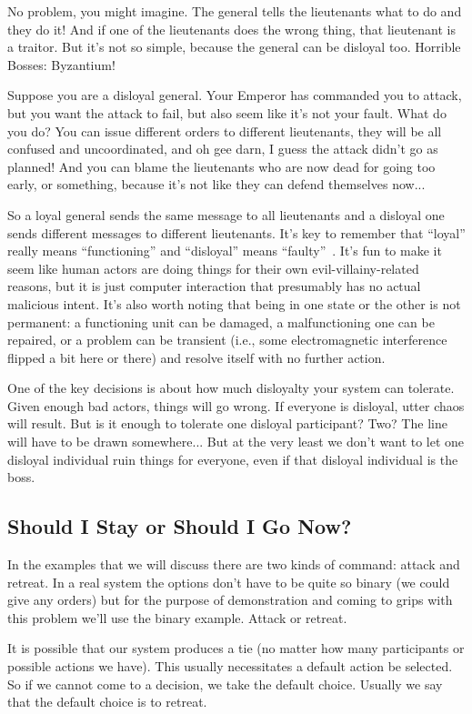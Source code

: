 No problem, you might imagine. The general tells the lieutenants what to do and they do it! And if one of the lieutenants does the wrong thing, that lieutenant is a traitor. But it's not so simple, because the general can be disloyal too. Horrible Bosses: Byzantium!

Suppose you are a disloyal general. Your Emperor has commanded you to attack, but you want the attack to fail, but also seem like it's not your fault. What do you do? You can issue different orders to different lieutenants, they will be all confused and uncoordinated, and oh gee darn, I guess the attack didn't go as planned! And you can blame the lieutenants who are now dead for going too early, or something, because it's not like they can defend themselves now...

So a loyal general sends the same message to all lieutenants and a disloyal one sends different messages to different lieutenants. It's key to remember that ``loyal'' really means ``functioning'' and ``disloyal'' means ``faulty''~\cite{mte241}. It's fun to make it seem like human actors are doing things for their own evil-villainy-related reasons, but it is just computer interaction that presumably has no actual malicious intent. It's also worth noting that being in one state or the other is not permanent: a functioning unit can be damaged, a malfunctioning one can be repaired, or a problem can be transient (i.e., some electromagnetic interference flipped a bit here or there) and resolve itself with no further action.

One of the key decisions is about how much disloyalty your system can tolerate. Given enough bad actors, things will go wrong. If everyone is disloyal, utter chaos will result. But is it enough to tolerate one disloyal participant? Two? The line will have to be drawn somewhere... But at the very least we don't want to let one disloyal individual ruin things for everyone, even if that disloyal individual is the boss.

\subsection*{Should I Stay or Should I Go Now?}
In the examples that we will discuss there are two kinds of command: attack and retreat. In a real system the options don't have to be quite so binary (we could give any orders) but for the purpose of demonstration and coming to grips with this problem we'll use the binary example. Attack or retreat.

It is possible that our system produces a tie (no matter how many participants or possible actions we have). This usually necessitates a default action be selected. So if we cannot come to a decision, we take the default choice. Usually we say that the default choice is to retreat.

